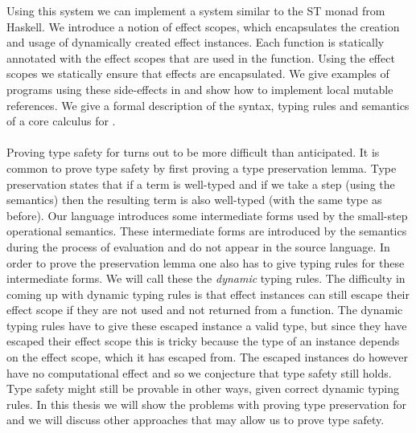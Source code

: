Using this system we can implement a system similar to the ST monad from Haskell.
We introduce a notion of effect scopes, which encapsulates the creation and usage of dynamically created effect instances.
Each function is statically annotated with the effect scopes that are used in the function.
Using the effect scopes we statically ensure that effects are encapsulated.
We give examples of programs using these side-effects in \lang{} and show how to implement local mutable references.
We give a formal description of the syntax, typing rules and semantics of a core calculus for \lang{}.
\\\\
Proving type safety for \lang{} turns out to be more difficult than anticipated.
It is common to prove type safety by first proving a type preservation lemma.
Type preservation states that if a term is well-typed and if we take a step (using the semantics) then the resulting term is also well-typed (with the same type as before).
Our language introduces some intermediate forms used by the small-step operational semantics.
These intermediate forms are introduced by the semantics during the process of evaluation and do not appear in the source language.
In order to prove the preservation lemma one also has to give typing rules for these intermediate forms.
We will call these the \emph{dynamic} typing rules.
The difficulty in coming up with dynamic typing rules is that effect instances can still escape their effect scope if they are not used and not returned from a function.
The dynamic typing rules have to give these escaped instance a valid type, but since they have escaped their effect scope this is tricky because the type of an instance depends on the effect scope, which it has escaped from.
The escaped instances do however have no computational effect and so we conjecture that type safety still holds.
Type safety might still be provable in other ways, given correct dynamic typing rules.
In this thesis we will show the problems with proving type preservation for \lang{} and we will discuss other approaches that may allow us to prove type safety.

